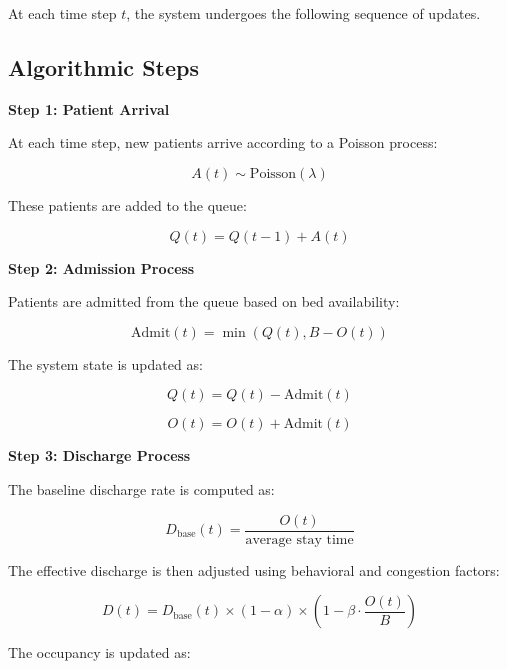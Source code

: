 \documentclass[11pt]{article}
\begin{document}
At each time step $t$, the system undergoes the following sequence of updates.

\subsection{Algorithmic Steps}

\textbf{Step 1: Patient Arrival}

At each time step, new patients arrive according to a Poisson process:

\begin{equation}
A(t) \sim \text{Poisson}(\lambda)
\end{equation}

These patients are added to the queue:

\begin{equation}
Q(t) = Q(t-1) + A(t)
\end{equation}

\textbf{Step 2: Admission Process}

Patients are admitted from the queue based on bed availability:

\begin{equation}
\text{Admit}(t) = \min(Q(t), B - O(t))
\end{equation}

The system state is updated as:

\begin{equation}
Q(t) = Q(t) - \text{Admit}(t)
\end{equation}

\begin{equation}
O(t) = O(t) + \text{Admit}(t)
\end{equation}

\textbf{Step 3: Discharge Process}

The baseline discharge rate is computed as:

\begin{equation}
D_{\text{base}}(t) = \frac{O(t)}{\text{average stay time}}
\end{equation}

The effective discharge is then adjusted using behavioral and congestion factors:

\begin{equation}
D(t) = D_{\text{base}}(t) \times (1 - \alpha) \times \left(1 - \beta \cdot \frac{O(t)}{B}\right)
\end{equation}

The occupancy is updated as:
\end{document}
